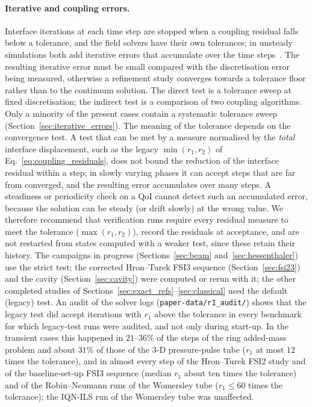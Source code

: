 \paragraph{Iterative and coupling errors.}
Interface iterations at each time step are stopped when a coupling residual falls below a tolerance, and the field solvers have their own tolerances; in unsteady simulations both add iterative errors that accumulate over the time steps~\citep{Eca2019}.
The resulting iterative error must be small compared with the discretisation error being measured, otherwise a refinement study converges towards a tolerance floor rather than to the continuum solution.
The direct test is a tolerance sweep at fixed discretisation; the indirect test is a comparison of two coupling algorithms.
Only a minority of the present cases contain a systematic tolerance sweep (Section~\ref{sec:iterative_errors}).
The meaning of the tolerance depends on the convergence test.
A test that can be met by a measure normalised by the \emph{total} interface displacement, such as the legacy $\min(r_1, r_2)$ of Eq.~\eqref{eq:coupling_residuals}, does not bound the reduction of the interface residual within a step; in slowly varying phases it can accept steps that are far from converged, and the resulting error accumulates over many steps.
A steadiness or periodicity check on a QoI cannot detect such an accumulated error, because the solution can be steady (or drift slowly) at the wrong value.
We therefore recommend that verification runs require every residual measure to meet the tolerance ($\max(r_1, r_2)$), record the residuals at acceptance, and are not restarted from states computed with a weaker test, since these retain their history.
The campaigns in progress (Sections~\ref{sec:beam} and~\ref{sec:hessenthaler}) use the strict test; the corrected Hron--Turek FSI3 sequence (Section~\ref{sec:fsi23}) and the cavity (Section~\ref{sec:cavity}) were computed or rerun with it; the other completed studies of Sections~\ref{sec:exact_refs}--\ref{sec:classical} used the default (legacy) test.
An audit of the solver logs (\texttt{paper-data/r1\_audit/}) shows that the legacy test did accept iterations with $r_1$ above the tolerance in every benchmark for which legacy-test runs were audited, and not only during start-up.
In the transient cases this happened in $21$--$36\%$ of the steps of the ring added-mass problem and about $31\%$ of those of the 3-D pressure-pulse tube ($r_1$ at most $12$ times the tolerance), and in almost every step of the Hron--Turek FSI2 study and of the baseline-set-up FSI3 sequence (median $r_1$ about ten times the tolerance) and of the Robin--Neumann runs of the Womersley tube ($r_1\leq60$ times the tolerance); the IQN-ILS run of the Womersley tube was unaffected.

